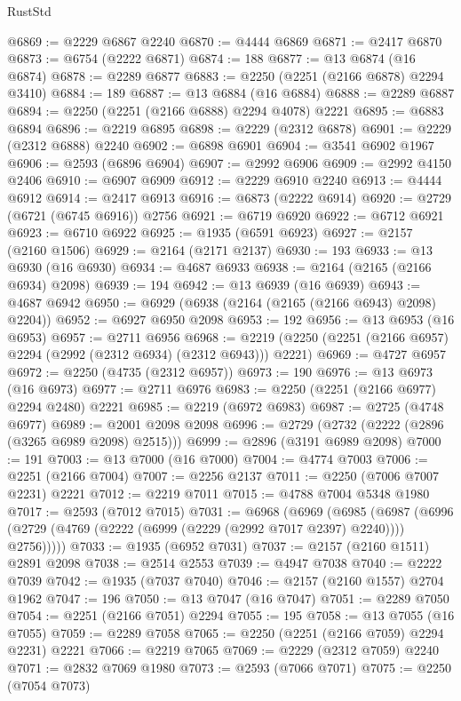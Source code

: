 \begin{lexlean}{RustStd}
\begin{coremodule}
@6869 := @2229 @6867 @2240
@6870 := @4444 @6869
@6871 := @2417 @6870
@6873 := @6754 (@2222 @6871)
@6874 := 188
@6877 := @13 @6874 (@16 @6874)
@6878 := @2289 @6877
@6883 := @2250 (@2251 (@2166 @6878) @2294 @3410)
@6884 := 189
@6887 := @13 @6884 (@16 @6884)
@6888 := @2289 @6887
@6894 := @2250 (@2251 (@2166 @6888) @2294 @4078) @2221
@6895 := @6883 @6894
@6896 := @2219 @6895
@6898 := @2229 (@2312 @6878)
@6901 := @2229 (@2312 @6888) @2240
@6902 := @6898 @6901
@6904 := @3541 @6902 @1967
@6906 := @2593 (@6896 @6904)
@6907 := @2992 @6906
@6909 := @2992 @4150 @2406
@6910 := @6907 @6909
@6912 := @2229 @6910 @2240
@6913 := @4444 @6912
@6914 := @2417 @6913
@6916 := @6873 (@2222 @6914)
@6920 := @2729 (@6721 (@6745 @6916)) @2756
@6921 := @6719 @6920
@6922 := @6712 @6921
@6923 := @6710 @6922
@6925 := @1935 (@6591 @6923)
@6927 := @2157 (@2160 @1506)
@6929 := @2164 (@2171 @2137)
@6930 := 193
@6933 := @13 @6930 (@16 @6930)
@6934 := @4687 @6933
@6938 := @2164 (@2165 (@2166 @6934) @2098)
@6939 := 194
@6942 := @13 @6939 (@16 @6939)
@6943 := @4687 @6942
@6950 := @6929 (@6938 (@2164 (@2165 (@2166 @6943) @2098) @2204))
@6952 := @6927 @6950 @2098
@6953 := 192
@6956 := @13 @6953 (@16 @6953)
@6957 := @2711 @6956
@6968 := @2219 (@2250 (@2251 (@2166 @6957) @2294 (@2992 (@2312 @6934) (@2312 @6943))) @2221)
@6969 := @4727 @6957
@6972 := @2250 (@4735 (@2312 @6957))
@6973 := 190
@6976 := @13 @6973 (@16 @6973)
@6977 := @2711 @6976
@6983 := @2250 (@2251 (@2166 @6977) @2294 @2480) @2221
@6985 := @2219 (@6972 @6983)
@6987 := @2725 (@4748 @6977)
@6989 := @2001 @2098 @2098
@6996 := @2729 (@2732 (@2222 (@2896 (@3265 @6989 @2098) @2515)))
@6999 := @2896 (@3191 @6989 @2098)
@7000 := 191
@7003 := @13 @7000 (@16 @7000)
@7004 := @4774 @7003
@7006 := @2251 (@2166 @7004)
@7007 := @2256 @2137
@7011 := @2250 (@7006 @7007 @2231) @2221
@7012 := @2219 @7011
@7015 := @4788 @7004 @5348 @1980
@7017 := @2593 (@7012 @7015)
@7031 := @6968
    (@6969
      (@6985
        (@6987 (@6996 (@2729 (@4769 (@2222 (@6999 (@2229 (@2992 @7017 @2397) @2240)))) @2756)))))
@7033 := @1935 (@6952 @7031)
@7037 := @2157 (@2160 @1511) @2891 @2098
@7038 := @2514 @2553
@7039 := @4947 @7038
@7040 := @2222 @7039
@7042 := @1935 (@7037 @7040)
@7046 := @2157 (@2160 @1557) @2704 @1962
@7047 := 196
@7050 := @13 @7047 (@16 @7047)
@7051 := @2289 @7050
@7054 := @2251 (@2166 @7051) @2294
@7055 := 195
@7058 := @13 @7055 (@16 @7055)
@7059 := @2289 @7058
@7065 := @2250 (@2251 (@2166 @7059) @2294 @2231) @2221
@7066 := @2219 @7065
@7069 := @2229 (@2312 @7059) @2240
@7071 := @2832 @7069 @1980
@7073 := @2593 (@7066 @7071)
@7075 := @2250 (@7054 @7073)

\end{coremodule}
\end{lexlean}

